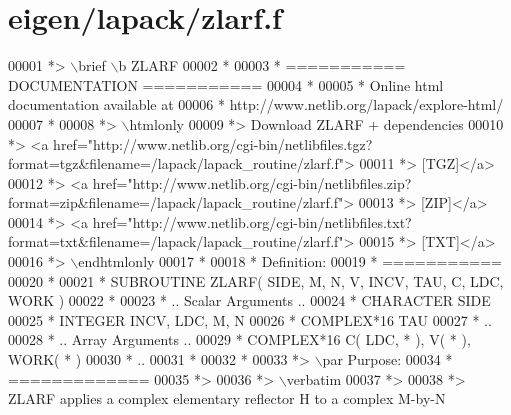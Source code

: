 \hypertarget{eigen_2lapack_2zlarf_8f_source}{}\section{eigen/lapack/zlarf.f}
\label{eigen_2lapack_2zlarf_8f_source}

\begin{DoxyCode}
00001 \textcolor{comment}{*> \(\backslash\)brief \(\backslash\)b ZLARF}
00002 \textcolor{comment}{*}
00003 \textcolor{comment}{*  =========== DOCUMENTATION ===========}
00004 \textcolor{comment}{*}
00005 \textcolor{comment}{* Online html documentation available at }
00006 \textcolor{comment}{*            http://www.netlib.org/lapack/explore-html/ }
00007 \textcolor{comment}{*}
00008 \textcolor{comment}{*> \(\backslash\)htmlonly}
00009 \textcolor{comment}{*> Download ZLARF + dependencies }
00010 \textcolor{comment}{*> <a
       href="http://www.netlib.org/cgi-bin/netlibfiles.tgz?format=tgz&filename=/lapack/lapack\_routine/zlarf.f"> }
00011 \textcolor{comment}{*> [TGZ]</a> }
00012 \textcolor{comment}{*> <a
       href="http://www.netlib.org/cgi-bin/netlibfiles.zip?format=zip&filename=/lapack/lapack\_routine/zlarf.f"> }
00013 \textcolor{comment}{*> [ZIP]</a> }
00014 \textcolor{comment}{*> <a
       href="http://www.netlib.org/cgi-bin/netlibfiles.txt?format=txt&filename=/lapack/lapack\_routine/zlarf.f"> }
00015 \textcolor{comment}{*> [TXT]</a>}
00016 \textcolor{comment}{*> \(\backslash\)endhtmlonly }
00017 \textcolor{comment}{*}
00018 \textcolor{comment}{*  Definition:}
00019 \textcolor{comment}{*  ===========}
00020 \textcolor{comment}{*}
00021 \textcolor{comment}{*       SUBROUTINE ZLARF( SIDE, M, N, V, INCV, TAU, C, LDC, WORK )}
00022 \textcolor{comment}{* }
00023 \textcolor{comment}{*       .. Scalar Arguments ..}
00024 \textcolor{comment}{*       CHARACTER          SIDE}
00025 \textcolor{comment}{*       INTEGER            INCV, LDC, M, N}
00026 \textcolor{comment}{*       COMPLEX*16         TAU}
00027 \textcolor{comment}{*       ..}
00028 \textcolor{comment}{*       .. Array Arguments ..}
00029 \textcolor{comment}{*       COMPLEX*16         C( LDC, * ), V( * ), WORK( * )}
00030 \textcolor{comment}{*       ..}
00031 \textcolor{comment}{*  }
00032 \textcolor{comment}{*}
00033 \textcolor{comment}{*> \(\backslash\)par Purpose:}
00034 \textcolor{comment}{*  =============}
00035 \textcolor{comment}{*>}
00036 \textcolor{comment}{*> \(\backslash\)verbatim}
00037 \textcolor{comment}{*>}
00038 \textcolor{comment}{*> ZLARF applies a complex elementary reflector H to a complex M-by-N}

\end{DoxyCode}
